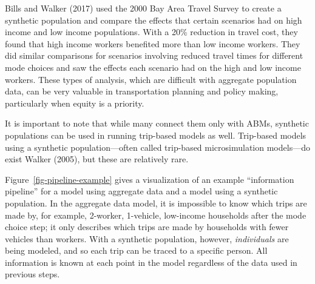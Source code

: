 \documentclass[fancy, twoside, mastersfancy, ms]{byuthesis}
\begin{document}
Bills and Walker (2017) used the 2000 Bay Area Travel Survey to create a
synthetic population and compare the effects that certain scenarios had
on high income and low income populations. With a 20\% reduction in
travel cost, they found that high income workers benefited more than low
income workers. They did similar comparisons for scenarios involving
reduced travel times for different mode choices and saw the effects each
scenario had on the high and low income workers. These types of
analysis, which are difficult with aggregate population data, can be
very valuable in transportation planning and policy making, particularly
when equity is a priority.

It is important to note that while many connect them only with ABMs,
synthetic populations can be used in running trip-based models as well.
Trip-based models using a synthetic population---often called trip-based
microsimulation models---do exist Walker (2005), but these are
relatively rare.

Figure~\ref{fig-pipeline-example} gives a visualization of an example
``information pipeline'' for a model using aggregate data and a model
using a synthetic population. In the aggregate data model, it is
impossible to know which trips are made by, for example, 2-worker,
1-vehicle, low-income households after the mode choice step; it only
describes which trips are made by households with fewer vehicles than
workers. With a synthetic population, however, \emph{individuals} are
being modeled, and so each trip can be traced to a specific person. All
information is known at each point in the model regardless of the data
used in previous steps.
\end{document}
